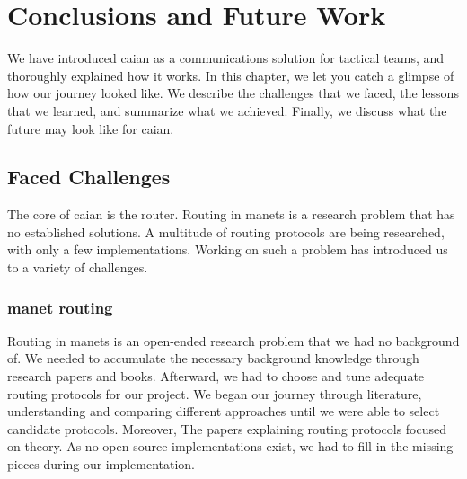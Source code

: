 \chapter{Conclusions and Future Work}



We have introduced \acrshort{caian} as a communications solution for tactical teams, and thoroughly explained how it works. In this chapter, we let you catch a glimpse of how our journey looked like. We describe the challenges that we faced, the lessons that we learned, and summarize what we achieved. Finally, we discuss what the future may look like for \acrshort{caian}.    

\section{Faced Challenges}

The core of \acrshort{caian} is the router. Routing in \acrshort{manets} is a research problem that has no established solutions. A multitude of routing protocols are being researched, with only a few implementations. Working on such a problem has introduced us to a variety of challenges.

\subsection{\acrshort{manet} routing}
Routing in \acrshort{manets} is an open-ended research problem that we had no background of. We needed to accumulate the necessary background knowledge through research papers and books. Afterward, we had to choose and tune adequate routing protocols for our project. We began our journey through literature, understanding and comparing different approaches until we were able to select candidate protocols. Moreover, The papers explaining routing protocols focused on theory. As no open-source implementations exist, we had to fill in the missing pieces during our implementation.

